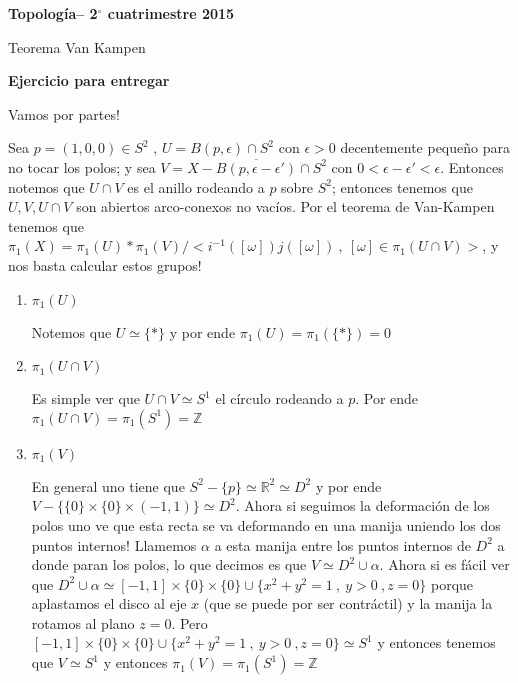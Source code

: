 \documentclass[11pt]{article}
\newcommand{\R}{{\mathbb{R}}}
\newenvironment{proof}[1][Demostraci\'on]{\begin{trivlist}
\item[\hskip \labelsep {\bfseries #1}]}{\end{trivlist}}
\newcommand{\Z}{\mathbb{Z}}
\begin{document}
\pagestyle{empty}
\pagestyle{fancy}
\fancyfoot[CO]{\slshape \thepage}
\renewcommand{\headrulewidth}{0pt}


\centerline{\bf Topolog\'ia-- 2$^\circ$
cuatrimestre 2015}
\centerline{\sc Teorema Van Kampen}

\bigskip

\textbf{Ejercicio para entregar}

\begin{proof}

Vamos por partes!

Sea $ p=(1,0,0) \in S^2 $ , $ U = B(p,\epsilon) \cap S^{2} $ con $ \epsilon > 0 $ decentemente peque\~no para no tocar los polos; y sea $ V = X - \overline{B(p,\epsilon - \epsilon ')} \cap S^{2} $ con $ 0< \epsilon - \epsilon ' < \epsilon $. Entonces notemos que $U \cap V $ es el anillo rodeando a $p$ sobre $S^{2}$; entonces tenemos que $U,V,U \cap V $ son abiertos arco-conexos no vac\'ios. Por el teorema de Van-Kampen tenemos que $\pi_1(X)=\pi_1(U)*\pi_1(V) / \mathord{<i^{-1}([\omega])j([\omega]) \ , \ [\omega] \in \pi_1(U \cap V)>}$, y nos basta calcular estos grupos!

\begin{enumerate}

\item{$\pi_1(U)$}

Notemos que $U \simeq \{*\}$ y por ende $\pi_1(U)=\pi_1(\{*\})=0$

\item{$\pi_1(U \cap V)$}

Es simple ver que $U \cap V \simeq S^{1}$ el c\'irculo rodeando a $p$. Por ende $\pi_1(U \cap V)= \pi_1(S^1)=\Z$

\item {$\pi_1(V)$}

En general uno tiene que $S^2 - \{p\} \simeq \R^2 \simeq D^2$ y por ende $V-\{\{0\}\times \{0\}\times (-1,1) \} \simeq D^2$. Ahora si seguimos la deformaci\'on de los polos uno ve que esta recta se va deformando en una manija uniendo los dos puntos internos! Llamemos $\alpha$ a esta manija entre los puntos internos de $D^2$ a donde paran los polos, lo que decimos es que $V \simeq D^2 \cup \alpha$. Ahora si es f\'acil ver que $D^2 \cup \alpha \simeq [-1,1]\times \{0\} \times \{0\} \cup \{x^2 + y^2 =1 \ , \ y>0 \ , z=0\}$ porque aplastamos el disco al eje $x$ (que se puede por ser contr\'actil) y la manija la rotamos al plano $z=0$. Pero $[-1,1]\times \{0\} \times \{0\} \cup \{x^2 + y^2 =1 \ , \ y>0 \ , z=0\} \simeq S^1$ y entonces tenemos que $V \simeq S^1$ y entonces $\pi_1(V) = \pi_1(S^1) = \Z$


\end{enumerate}
\end{proof}
\end{document}
